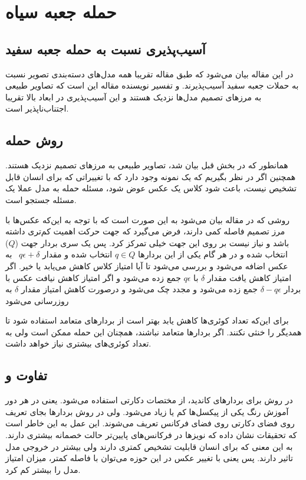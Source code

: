 \section{حمله جعبه سیاه}
\subsection{آسیب‌پذیری نسبت به حمله جعبه سفید}
در این مقاله بیان می‌شود که طبق مقاله 
\cite{athalye2018obfuscated}
تقریبا همه مدل‌های دسته‌بندی تصویر نسبت به حملات جعبه سفید آسیب‌پذیرند. و تفسیر نویسنده مقاله این است که تصاویر طبیعی به مرزهای تصمیم مدل‌ها نزدیک هستند و این آسیب‌پذیری در ابعاد بالا تقریبا اجتناب‌ناپذیر است.
\subsection{روش حمله }
همانطور که در بخش قبل بیان شد، تصاویر طبیعی به مرزهای تصمیم نزدیک هستند. همچنین اگر در نظر بگیریم که یک نمونه وجود دارد که با تغییراتی که برای انسان قابل تشخیص نیست، باعث شود کلاس یک عکس عوض شود، مسئله حمله به مدل عملا یک مسئله جستجو است. 

روشی که در مقاله بیان می‌شود به این صورت است که با توجه به این‌که عکس‌ها با مرز تصمیم فاصله کمی دارند، فرض می‌گیرد که جهت حرکت اهمیت کم‌تری داشته باشد و نیاز نیست بر روی این جهت خیلی تمرکز کرد. پس یک سری بردار جهت
($Q$)
 انتخاب شده و در هر گام یکی از این بردارها 
 $q \in Q$
 انتخاب شده و مقدار
$q \epsilon +‌ \delta$ 
به عکس اضافه می‌شود و بررسی می‌شود تا آیا امتیاز کلاس کاهش می‌یابد یا خیر. اگر امتیاز کاهش یافت مقدار 
$\delta$
با
$q \epsilon$
جمع زده می‌شود و اگر
 امتیاز کاهش نیافت عکس با بردار 
$ \delta -q \epsilon $
جمع زده می‌شود و مجدد چک می‌شود و درصورت کاهش امتیاز مقدار 
$\delta$
به روزرسانی می‌شود


برای این‌که تعداد کوئری‌ها کاهش یابد بهتر است از بردارهای متعامد استفاده شود تا همدیگر را خنثی نکنند. اگر بردارها متعامد نباشند، همچنان این حمله ممکن است ولی به تعداد کوئری‌های بیشتری نیاز خواهد داشت. 
\subsection{تفاوت  و }
در روش 
 برای بردارهای کاندید، از مختصات دکارتی استفاده می‌شود. یعنی در هر دور آموزش رنگ یکی از پیکسل‌ها کم یا زیاد می‌شود. ولی در روش 
 بردارها بجای تعریف روی فضای دکارتی روی فضای فرکانس تعریف می‌شوند. این عمل به این خاطر است که تحقیقات نشان داده که نویزها در فرکانس‌های پایین‌تر حالت خصمانه 
 بیشتری دارند. به این معنی که برای انسان قابلیت تشخیص کمتری دارند ولی بیشتر در خروجی مدل تاثیر دارند. پس یعنی با تغییر عکس در این حوزه می‌توان با فاصله کمتر، میزان امتیاز مدل را بیشتر کم کرد. 
